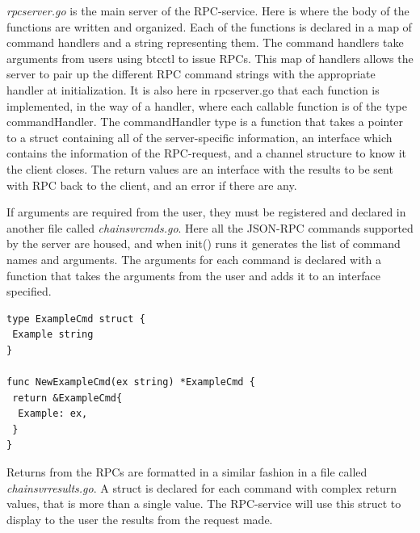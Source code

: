 \documentclass[12pt]{article}
\begin{document}
{\it{rpcserver.go}} is the main server of the RPC-service. Here is where the body of the functions are written and organized. Each of the functions is declared in a map of command handlers and a string representing them. The command handlers take arguments from users using btcctl to issue RPCs. This map of handlers allows the server to pair up the different RPC command strings with the appropriate handler at initialization. It is also here in rpcserver.go that each function is implemented, in the way of a handler, where each callable function is of the type commandHandler. The commandHandler type is a function that takes a pointer to a struct containing all of the server-specific information, an interface which contains the information of the RPC-request, and a channel structure to know it the client closes. The return values are an interface with the results to be sent with RPC back to the client, and an error if there are any.

If arguments are required from the user, they must be registered and declared in another file called {\it{chainsvrcmds.go}}. Here all the JSON-RPC commands supported by the server are housed, and when init() runs it generates the list of command names and arguments. The arguments for each command is declared with a function that takes the arguments from the user and adds it to an interface specified. 


\begin{lstlisting}[float=h!,caption={Command argument formatting},label=lst:cmdArg]
type ExampleCmd struct {
 Example string
}

func NewExampleCmd(ex string) *ExampleCmd {
 return &ExampleCmd{
  Example: ex,
 }
}
\end{lstlisting}

Returns from the RPCs are formatted in a similar fashion in a file called \textit{chainsvrresults.go}. A struct is declared for each command with complex return values, that is more than a single value. The RPC-service will use this struct to display to the user the results from the request made. 
 
\end{document}
